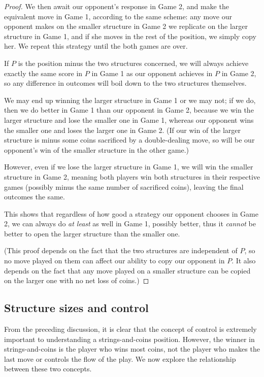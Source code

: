 \documentclass[a4paper,twocolumn]{article}
\begin{document}
\begin{proof}
  We then await our opponent's response in Game 2, and make the
  equivalent move in Game 1, according to the same scheme: any move
  our opponent makes on the smaller structure in Game 2 we replicate
  on the larger structure in Game 1, and if she moves in the rest of
  the position, we simply copy her. We repeat this strategy until the
  both games are over.

  If $P$ is the position minus the two structures concerned, we will
  always achieve exactly the same score in $P$ in Game 1 as our
  opponent achieves in $P$ in Game 2, so any difference in outcomes
  will boil down to the two structures themselves.

  We may end up winning the larger structure in Game 1 or we may not;
  if we do, then we do better in Game 1 than our opponent in Game 2,
  because we win the larger structure and lose the smaller one in Game
  1, whereas our opponent wins the smaller one and loses the larger
  one in Game 2. (If our win of the larger structure is minus some
  coins sacrificed by a double-dealing move, so will be our opponent's
  win of the smaller structure in the other game.)

  However, even if we lose the larger structure in Game 1, we will win
  the smaller structure in Game 2, meaning both players win both
  structures in their respective games (possibly minus the same number
  of sacrificed coins), leaving the final outcomes the same.

  This shows that regardless of how good a strategy our opponent
  chooses in Game 2, we can always do \emph{at least} as well in Game
  1, possibly better, thus it \emph{cannot} be better to open the
  larger structure than the smaller one.

  (This proof depends on the fact that the two structures are
  independent of $P$, so no move played on them can affect our ability
  to copy our opponent in $P$. It also depends on the fact that any
  move played on a smaller structure can be copied on the larger one
  with no net loss of coins.)
\end{proof}

\subsection{Structure sizes and control}
\label{smallchains}

From the preceding discussion, it is clear that the concept of control
is extremely important to understanding a strings-and-coins
position. However, the winner in strings-and-coins is the player who
wins most coins, not the player who makes the last move or controls
the flow of the play. We now explore the relationship between these
two concepts.
\end{document}
